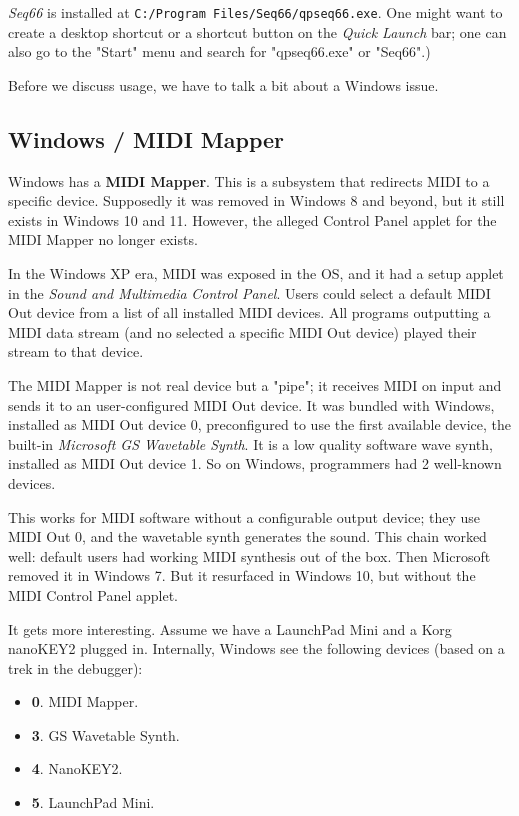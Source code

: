    \textsl{Seq66} is installed at
   \texttt{C:/Program Files/Seq66/qpseq66.exe}.
   One might want to create a desktop shortcut or a shortcut button on
   the \textsl{Quick Launch} bar; one can also go to the
   "Start" menu and search for "qpseq66.exe" or "Seq66".)

   Before we discuss usage, we have to talk a bit about a Windows issue.

\subsection{Windows / MIDI Mapper}
\label{subsec:windows_midi_mapper}

   Windows has a \textbf{MIDI Mapper}.
   This is a subsystem that redirects MIDI to a specific device.
   Supposedly it was removed in Windows 8 and beyond, but it still
   exists in Windows 10 and 11.
   However, the alleged Control Panel applet
   for the MIDI Mapper no longer exists.

   In the Windows XP era, MIDI was exposed in the OS, 
   and it had a setup applet in the
   \textsl{Sound and Multimedia}
   \textsl{Control Panel}.
   Users could select a default MIDI Out device from a list of all
   installed MIDI devices.
   All programs outputting a MIDI data stream
   (and no selected a specific MIDI Out device)
   played their stream to that device.

   The MIDI Mapper is not real device but a "pipe";
   it receives MIDI on input and sends it to an user-configured
   MIDI Out device.
   It was bundled with Windows, installed as MIDI Out device 0, preconfigured
   to use the first available device, the built-in
   \textsl{Microsoft GS Wavetable Synth}.
   It is a low quality software wave synth, installed as MIDI Out device 1.
   So on Windows, programmers had 2 well-known devices.

   This works for MIDI software without a configurable output device; they
   use MIDI Out 0, and the wavetable synth generates the sound.
   This chain worked well: default users had working MIDI synthesis
   out of the box.
   Then Microsoft removed it in Windows 7.
   But it resurfaced in Windows 10, but without the
   MIDI Control Panel applet.

   It gets more interesting.
   Assume we have a LaunchPad Mini and a Korg nanoKEY2 plugged in.
   Internally, Windows see the following devices (based on a trek
   in the debugger):

   \begin{itemize}
      \item \textbf{0}. MIDI Mapper.
      \item \textbf{3}. GS Wavetable Synth.
      \item \textbf{4}. NanoKEY2.
      \item \textbf{5}. LaunchPad Mini.
   \end{itemize}

